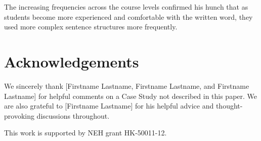 \documentclass{sig-alternate}
\begin{document}
The increasing frequencies across the course levels confirmed his hunch that as students become more experienced and comfortable with the written word, they used more complex sentence structures more frequently. 


\section{Acknowledgements}
We sincerely thank [Firstname Lastname, Firstname Lastname, and Firstname Lastname] for helpful comments on a Case Study not described in this paper. We are also grateful to [Firstname Lastname] for his helpful advice and thought-provoking discussions throughout.

This work is supported by NEH grant HK-50011-12.


 
  
\end{document}
